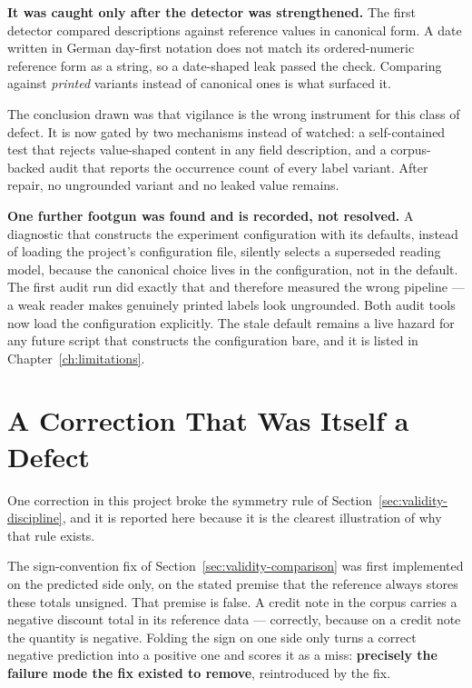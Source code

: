 \textbf{It was caught only after the detector was strengthened.} The first detector compared
descriptions against reference values in canonical form. A date written in German day-first
notation does not match its ordered-numeric reference form as a string, so a date-shaped leak
passed the check. Comparing against \emph{printed} variants instead of canonical ones is what
surfaced it.

The conclusion drawn was that vigilance is the wrong instrument for this class of defect. It is
now gated by two mechanisms instead of watched: a self-contained test that rejects
value-shaped content in any field description, and a corpus-backed audit that reports the
occurrence count of every label variant. After repair, no ungrounded variant and no leaked
value remains.

\textbf{One further footgun was found and is recorded, not resolved.} A diagnostic that
constructs the experiment configuration with its defaults, instead of loading the project's
configuration file, silently selects a superseded reading model, because the canonical choice
lives in the configuration, not in the default. The first audit run did exactly that and
therefore measured the wrong pipeline --- a weak reader makes genuinely printed labels look
ungrounded. Both audit tools now load the configuration explicitly. The stale default remains a
live hazard for any future script that constructs the configuration bare, and it is listed in
Chapter~\ref{ch:limitations}.

\section{A Correction That Was Itself a Defect}
\label{sec:validity-selfinflicted}

One correction in this project broke the symmetry rule of Section~\ref{sec:validity-discipline}, and
it is reported here because it is the clearest illustration of why that rule
exists.

The sign-convention fix of Section~\ref{sec:validity-comparison} was first implemented on the
predicted side only, on the stated premise that the reference always stores these totals
unsigned. That premise is false. A credit note in the corpus carries a negative discount total
in its reference data --- correctly, because on a credit note the quantity is negative. Folding
the sign on one side only turns a correct negative prediction into a positive one and scores it
as a miss: \textbf{precisely the failure mode the fix existed to remove}, reintroduced by the
fix.

